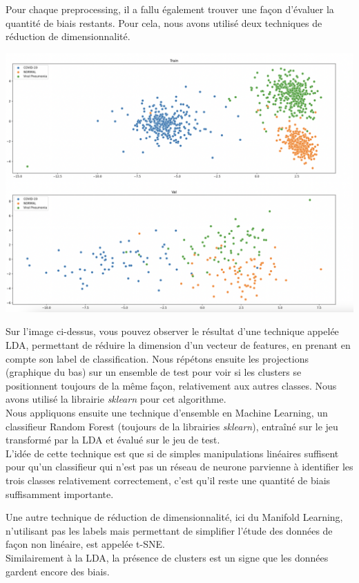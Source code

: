 \documentclass{article}
\begin{document}
	\par Pour chaque preprocessing, il a fallu également trouver une façon d'évaluer la quantité de biais restants. Pour cela, nous avons utilisé deux techniques de réduction de dimensionnalité.
	
	\begin{center}
	\includegraphics[scale=0.4]{lda.png}
	\end{center}	
	
	\par Sur l'image ci-dessus, vous pouvez observer le résultat d'une technique appelée LDA, permettant de réduire la dimension d'un vecteur de features, en prenant en compte son label de classification. Nous répétons ensuite les projections (graphique du bas) sur un ensemble de test pour voir si les clusters se positionnent toujours de la même façon, relativement aux autres classes. Nous avons utilisé la librairie \textit{sklearn} pour cet algorithme.\\
	Nous appliquons ensuite une technique d'ensemble en Machine Learning, un classifieur Random Forest (toujours de la librairies \textit{sklearn}), entraîné sur le jeu transformé par la LDA et évalué sur le jeu de test.\\
	L'idée de cette technique est que si de simples manipulations linéaires suffisent pour qu'un classifieur qui n'est pas un réseau de neurone parvienne à identifier les trois classes relativement correctement, c'est qu'il reste une quantité de biais suffisamment importante.
	
	\par Une autre technique de réduction de dimensionnalité, ici du Manifold Learning, n'utilisant pas les labels mais permettant de simplifier l'étude des données de façon non linéaire, est appelée t-SNE.\\
	Similairement à la LDA, la présence de clusters est un signe que les données gardent encore des biais.
	
\end{document}
